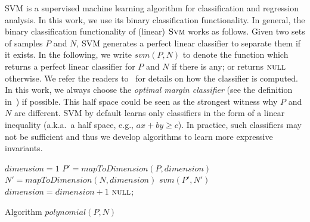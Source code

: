 SVM is a supervised machine learning algorithm for classification and regression analysis. In this work, we use its binary classification functionality. In general, the binary classification functionality of (linear) $\textsc{Svm}$ works as follows. Given two sets of samples $P$ and $N$, SVM generates a perfect linear classifier to separate them if it exists. In the following, we write $\mathit{svm}(P, N)$ to denote the function which returns a perfect linear classifier for $P$ and $N$ if there is any; or returns $\textsc{null}$ otherwise. We refer the readers to~\cite{svm} for details on how the classifier is computed. In this work, we always choose the \textit{optimal margin classifier} (see the definition in~\cite{Sharma2012}) if possible. This half space could be seen as the strongest witness why $P$ and $N$ are different. SVM by default learns only classifiers in the form of a linear inequality (a.k.a.~a half space, e.g., $a x + b y \geq c$). In practice, such classifiers may not be sufficient and thus we develop algorithms to learn more expressive invariants.

\begin{algorithm}[t]
\SetAlgoVlined
\Indm
\Indp
    $dimension = 1$\;
     {
        $P' = \mathit{mapToDimension}(P, \mathit{dimension})$\;
        $N' = \mathit{mapToDimension}(N, \mathit{dimension})$\;
         {
            \Return $\mathit{svm}(P', N')$\;
        }
    	$\mathit{dimension} = \mathit{dimension} + 1$\;
    }
    \Return $\textsc{null}$;
\caption{Algorithm $\mathit{polynomial}(P,N)$}
\label{alg:polynomialSVM}
\end{algorithm}

